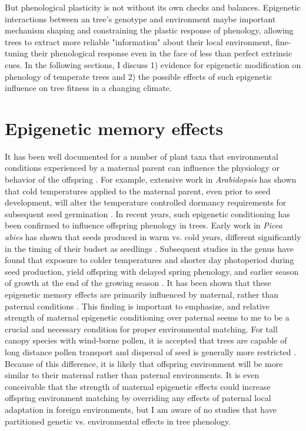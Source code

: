 \documentclass{article}\usepackage[]{graphicx}\usepackage[]{color}
\begin{document}
\par But phenological plasticity is not without its own checks and balances. Epigenetic interactions between an tree's genotype and environment maybe important mechanism shaping and constraining the plastic response of phenology, allowing trees to extract more reliable "information" about their local environment, fine-tuning their phenological response even in the face of less than perfect extrinsic cues. In the following sections, I discuss 1) evidence for epigenetic modification on phenology of temperate trees and 2) the possible effects of such epigenetic influence on tree fitness in a changing climate.
\section{Epigenetic memory effects}
\par It has been well documented for a number of plant taxa that environmental conditions experienced by a maternal parent can influence the physiology or behavior of the offspring \citep{}. For example, extensive work in \textit{Arabidopsis} has shown that cold temperatures applied to the maternal parent, even prior to seed development, will alter the temperature controlled dormancy requirements for subsequent seed germination \citep{Auge2017}. In recent years, such epigenetic conditioning has been confirmed to influence offspring phenology in trees. Early work in \textit{Picea abies} has shown that seeds produced in warm vs. cold years, different significantly in the timing of their budset as seedlings \citep{Kohmann1994}. Subsequent studies in the genus have found that exposure to colder temperatures and shorter day photoperiod during seed production, yield offspring with delayed spring phenology, and earlier season of growth at the end of the growing season \citep{Johnsen2005, Gomery2014}. It has been shown that these epigenetic memory effects are primarily influenced by maternal, rather than paternal conditions \citep{Johnsen1996}. This finding is important to emphasize, and relative strength of maternal epigenetic conditioning over paternal seems to me to be a crucial and necessary condition for proper environmental matching. For tall canopy species with wind-borne pollen, it is accepted that trees are capable of long distance pollen transport and dispersal of seed is generally more restricted \citep{}. Because of this difference, it is likely that offspring environment will be more similar to their maternal rather than paternal environments. It is even conceivable that the strength of maternal epigenetic effects could increase offspring environment matching by overriding any effects of paternal local adaptation in foreign environments, but I am aware of no studies that have partitioned genetic vs. environmental effects in tree phenology.
\end{document}
